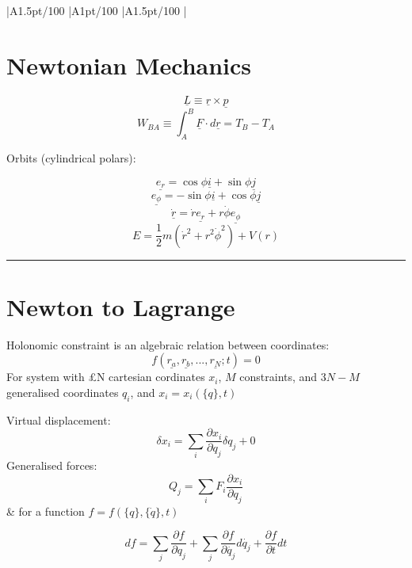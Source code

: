 \documentclass[table,cmyk]{article}
\makeatletter
\newcommand\ratio[2]{\strip@pt\dimexpr#1pt/#2\relax}
\makeatother
\begin{document}
\begin{longtable}
{
    |A{1.5}{\ratio{30}{100}}%
    |A{1}{\ratio{30}{100}}%
    |A{1.5}{\ratio{30}{100}}%
    |%
}\hline
\section*{Newtonian Mechanics}
\[ \underline{L} \equiv \underline{r} \times \underline{p}\]
\[ W_{BA} \equiv \int_{A}^{B} \underline{F}\cdot d\underline{r} = T_B - T_A\]

Orbits (cylindrical polars):

\[\underline{e_r} = \cos\phi\underline{i} + \sin\phi\underline{j}
\]\[
\underline{e_{\phi}} = -\sin\phi\underline{i} + \cos\phi\underline{j}\]
\[\underline{\dot{r}} = \dot{r} \underline{e_r} + r \dot{\phi} \underline{e_{\phi}}\]
\[E = \frac{1}{2}m(\dot{r}^2 + r^2\dot{\phi}^2) +V(r)\]

\noindent\rule{7.8cm}{0.4pt}

\section*{Newton to Lagrange}
Holonomic constraint is an algebraic relation between coordinates:
\[f(\underline{r_a},\underline{r_b},...,\underline{r_N};t) = 0\]
For system with £N cartesian cordinates $x_i$, $M$ constraints, and $3N-M$ generalised coordinates $q_i$, and $x_i = x_i(\{q\},t)$
\newline

Virtual displacement:
\[\delta x_i = \sum_{i} \frac{\partial x_i}{\partial q_j} \delta q_j + 0\]
Generalised forces:
\[Q_j = \sum_{i} F_i \frac{\partial x_i}{\partial q_j}\]
&
for a function $f = f(\{q\},\{\dot{q}\},t)$

\[df = \sum_{j} \frac{\partial f}{\partial q_j} + \sum_{j} \frac {\partial f}{\partial \dot{q_j}} d\dot{q_j} + \frac{\partial f}{\partial t}dt\]


\end{longtable}
\end{document}
